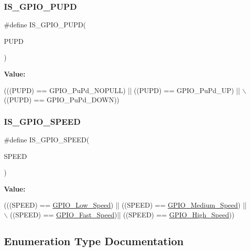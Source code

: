 \subsubsection{\texorpdfstring{I\+S\+\_\+\+G\+P\+I\+O\+\_\+\+P\+U\+PD}{IS\_GPIO\_PUPD}}
{\footnotesize\ttfamily \#define I\+S\+\_\+\+G\+P\+I\+O\+\_\+\+P\+U\+PD(\begin{DoxyParamCaption}\item[{}]{P\+U\+PD }\end{DoxyParamCaption})}

{\bfseries Value\+:}
\begin{DoxyCode}
(((PUPD) == GPIO\_PuPd\_NOPULL) || ((PUPD) == GPIO\_PuPd\_UP) || \(\backslash\)
                            ((PUPD) == GPIO\_PuPd\_DOWN))
\end{DoxyCode}
\mbox{\label{group___g_p_i_o_ga888e1f951df2fe9dbf827528051a3a56}} 
\subsubsection{\texorpdfstring{I\+S\+\_\+\+G\+P\+I\+O\+\_\+\+S\+P\+E\+ED}{IS\_GPIO\_SPEED}}
{\footnotesize\ttfamily \#define I\+S\+\_\+\+G\+P\+I\+O\+\_\+\+S\+P\+E\+ED(\begin{DoxyParamCaption}\item[{}]{S\+P\+E\+ED }\end{DoxyParamCaption})}

{\bfseries Value\+:}
\begin{DoxyCode}
(((SPEED) == \mbox{\hyperlink{group___g_p_i_o_gga062ad92b67b4a1f301c161022cf3ba8ea898ec2036718768d42e79afcb95ce5bf}{GPIO\_Low\_Speed}}) || ((SPEED) == \mbox{\hyperlink{group___g_p_i_o_gga062ad92b67b4a1f301c161022cf3ba8eaeed9485cfebba319947e3ef495e44371}{GPIO\_Medium\_Speed}}) || \(\backslash\)
                              ((SPEED) == \mbox{\hyperlink{group___g_p_i_o_gga062ad92b67b4a1f301c161022cf3ba8ea91731d092dedee851773cea4698662e6}{GPIO\_Fast\_Speed}})||  ((SPEED) == 
      \mbox{\hyperlink{group___g_p_i_o_gga062ad92b67b4a1f301c161022cf3ba8ea5b6a7186d45e9daebfc03b7a309162e8}{GPIO\_High\_Speed}}))
\end{DoxyCode}


\subsection{Enumeration Type Documentation}
\mbox{\label{group___g_p_i_o_ga1347339e1c84a196fabbb31205eec5d4}} 
